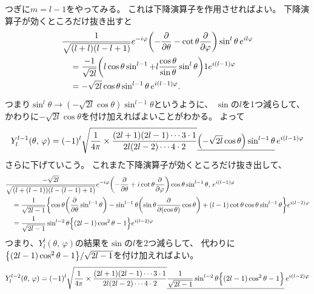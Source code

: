 \documentclass[../master.tex]{subfiles}
\begin{document}
つぎに\(m=l-1\)をやってみる。
これは下降演算子を作用させればよい。
下降演算子が効くところだけ抜き出すと
\begin{equation}\begin{aligned}[b]
    & \frac{1}{\sqrt{(l+l)(l-l+1)}}e^{-i\varphi}\qty(-\pdv{\theta}-\cot\theta\pdv{\varphi})\sin^l\theta \, e^{il\varphi}\\
	&\quad =\frac{-1}{\sqrt{2l}}\qty(l\cos\theta\sin^{l-1}+l\frac{\cos\theta}{\sin\theta}\sin^l\theta)1e^{i(l-1)\varphi} \\
	&\quad =-\sqrt{2l}\cos\theta\sin^{l-1}\theta\,e^{i(l-1)\varphi}.
\end{aligned}\end{equation}
つまり\(\sin^l\theta\rightarrow(-\sqrt{2l}\cos\theta)\sin^{l-1}\theta\)というように、
\(\sin\)の\(l\)を1つ減らして、かわりに\(-\sqrt{2l}\cos\theta\)を付け加えればよいことがわかる。
よって
\begin{equation}
	Y_{l}^{l-1}(\theta,\,\varphi)=(-1)^l
	\sqrt{\frac{1}{4\pi}\times\frac{(2l+1)(2l-1)\cdots 3\cdot 1}{2l(2l-2) \cdots 4\cdot 2}}
	\underline{\qty(-\sqrt{2l}\cos\theta)\sin^{l-1}\theta} \, e^{i(l-1)\varphi}
\end{equation}
さらに下げていこう。
これまた下降演算子が効くところだけ抜き出して、
\begin{equation}\begin{aligned}[b]
    & \frac{-\sqrt{2l}}{\sqrt{(l+(l-1))(l-(l-1)+1)}}e^{-i\varphi}\qty(-\pdv{\theta} + i\cot\theta\pdv{\varphi})\cos\theta\sin^{l-1}\theta,\,e^{i(l-1)\varphi}  \\
	 & \quad=\frac{1}{\sqrt{2l-1}}
	\qty{\cos\theta\qty(\pdv{\theta}\sin^{l-1}\theta)
	-\sin^{l-1}\theta\qty(\sin\theta\pdv{(\cos\theta)}\cos\theta) + (l-1)\cot\theta\cos\theta\sin^{l-1}\theta}e^{i(l-2)\varphi}                                       \\
	 & \quad=\frac{1}{\sqrt{2l-1}}\sin^{l-2}\theta\Bigr\{(2l-1)\cos^2\theta-1\Bigl\}e^{i(l-2)\varphi}
\end{aligned}\end{equation}
つまり、\(Y_l^l(\theta,\,\varphi)\)の結果を\(\sin\)の\(l\)を2つ減らして、
代わりに\(\qty{(2l-1)\cos^2\theta-1}/\sqrt{2l-1}\)を付け加えればよい。
\begin{equation}
	Y_l^{l-2}(\theta,\,\varphi)
	= (-1)^l\sqrt{\frac{1}{4\pi}\times\frac{(2l+1)(2l-1)\cdots 3\cdot 1}{2l(2l-2) \cdots 4\cdot 2}}
	\underline{\frac{1}{\sqrt{2l-1}}\sin^{l-2}\theta\Bigr\{(2l-1)\cos^2\theta-1\Bigl\}} \, e^{i(l-2)\varphi}
\end{equation}
\end{document}
